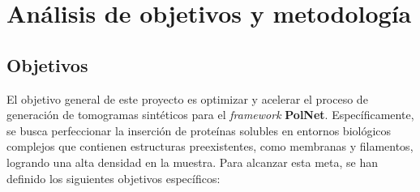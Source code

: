 

\chapter{Análisis de objetivos y metodología}

\section{Objetivos}

El objetivo general de este proyecto es optimizar y acelerar el proceso de generación de tomogramas sintéticos para el \textit{framework} \textbf{PolNet}. Específicamente, se busca perfeccionar la inserción de proteínas solubles en entornos biológicos complejos que contienen estructuras preexistentes, como membranas y filamentos, logrando una alta densidad en la muestra. Para alcanzar esta meta, se han definido los siguientes objetivos específicos:

